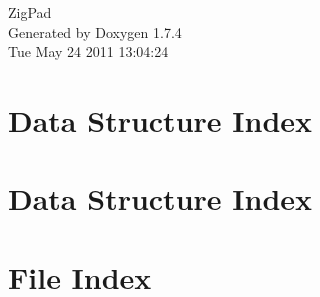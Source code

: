 \documentclass[a4paper]{book}
\begin{document}
\hypersetup{pageanchor=false}
\begin{titlepage}
\vspace*{7cm}
\begin{center}
{\Large ZigPad }\\
\vspace*{1cm}
{\large Generated by Doxygen 1.7.4}\\
\vspace*{0.5cm}
{\small Tue May 24 2011 13:04:24}\\
\end{center}
\end{titlepage}
\clearemptydoublepage
{}
\tableofcontents
\clearemptydoublepage
{}
\hypersetup{pageanchor=true}
\chapter{Data Structure Index}

\chapter{Data Structure Index}

\chapter{File Index}

\end{document}
